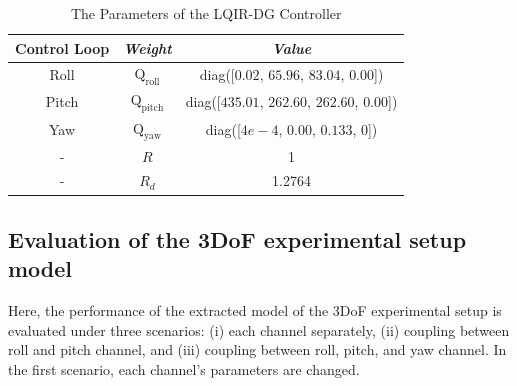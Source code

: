 \documentclass[3p,times]{elsarticle}
\begin{document}
\begin{table}[!h]
	\renewcommand{\arraystretch}{1.3}
	\caption{The Parameters of the LQIR-DG Controller}
	\begin{center}
	\begin{tabular}{c c c}
	\hline
	\textbf{Control Loop} & \textbf{\textit{Weight}}& \textbf{\textit{Value}} \\
	\hline
	Roll & 
	$\boldsymbol{{\mathrm{Q_{\text{roll}}}}}$ & diag([$0.02$, $65.96$, $83.04$, $0.00$])\\
	Pitch & 
	$\boldsymbol{{\mathrm{Q_{\text{pitch}}}}}$ & diag([$435.01$, $262.60$, $262.60$, $0.00$])\\
	Yaw & 
	$\boldsymbol{{\mathrm{Q_{\text{yaw}}}}}$ & diag([$4e\!-\!4$, $0.00$, $0.133$, $0$])\\
	-& $R$ & 1\\
	-& $R_{d}$ & 1.2764\\
	\hline
	\end{tabular}
	\end{center}
	\label{tab:control weight_new}
\end{table}




\subsection{Evaluation of the 3DoF experimental setup model}

\noindent Here, the performance of the extracted model of the 3DoF experimental setup is evaluated under three scenarios: (i) each channel separately, (ii) coupling between roll and pitch channel, and (iii) coupling between roll, pitch, and yaw channel. In the first scenario, each channel's parameters are changed.
\end{document}
